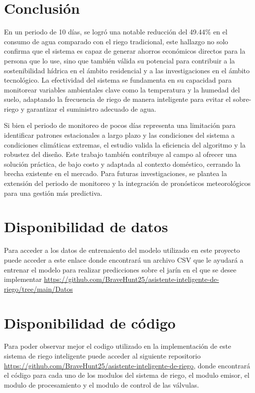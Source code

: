 \documentclass[pdflatex,sn-mathphys-num]{sn-jnl}%
\theoremstyle{thmstyleone}%
\theoremstyle{thmstyletwo}%
\theoremstyle{thmstylethree}%
\begin{document}
\begin{multicols}{2}
\section*{Conclusión}

En un periodo de 10 días, se logró una notable reducción del 49.44\% en el consumo de agua comparado con el riego tradicional, este hallazgo no solo confirma que el sistema es capaz de generar ahorros económicos directos para la persona que lo use, sino que también válida su potencial para contribuir a la sostenibilidad hídrica en el ámbito residencial y a las investigaciones en el ámbito tecnológico. La efectividad del sistema se fundamenta en su capacidad para monitorear variables ambientales clave como la temperatura y la humedad del suelo, adaptando la frecuencia de riego de manera inteligente para evitar el sobre-riego y garantizar el suministro adecuado de agua.

Si bien el periodo de monitoreo de pocos días representa una limitación para identificar patrones estacionales a largo plazo y las condiciones del sistema a condiciones climáticas extremas, el estudio valida la eficiencia del algoritmo y la robustez del diseño. Este trabajo también contribuye al campo al ofrecer una solución práctica, de bajo costo y adaptada al contexto doméstico, cerrando la brecha existente en el mercado. Para futuras investigaciones, se plantea la extensión del periodo de monitoreo y la integración de pronósticos meteorológicos para una gestión más predictiva.

\section*{Disponibilidad de datos}
Para acceder a los datos de entrenaiento del modelo utilizado en este proyecto puede acceder a este enlace donde encontrará un archivo CSV que le ayudará a entrenar el modelo para realizar predicciones sobre el jarín en el que se desee implementar \url{https://github.com/BraveHunt25/asistente-inteligente-de-riego/tree/main/Datos}

\section*{Disponibilidad de código}
Para poder observar mejor el codigo utilizado en la implementación de este sistema de riego inteligente puede acceder al siguiente repositorio \url{https://github.com/BraveHunt25/asistente-inteligente-de-riego}, donde encontrará el código para cada uno de los modulos del sistema de riego, el modulo emisor, el modulo de procesamiento y el modulo de control de las válvulas.


\end{multicols}
\end{document}
